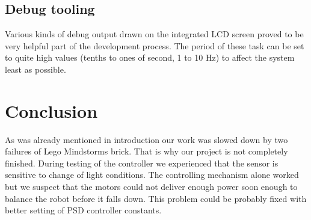 \documentclass{article}
\begin{document}
\subsection{Debug tooling}

Various kinds of debug output drawn on the integrated LCD screen proved to be very helpful part of the development process. The period of these task can be set to quite high values (tenths to ones of second, 1 to 10 Hz) to affect the system least as possible.

\section{Conclusion}

As was already mentioned in introduction our work was slowed down by two
failures of Lego Mindstorms brick. That is why our project is not completely
finished. During testing of the controller we experienced that the sensor is
sensitive to change of light conditions. The controlling mechanism alone worked
but we suspect that the motors could not deliver enough power soon enough to
balance the robot before it falls down. This problem could be probably fixed
with better setting of PSD controller constants.

\printbibliography
\end{document}
